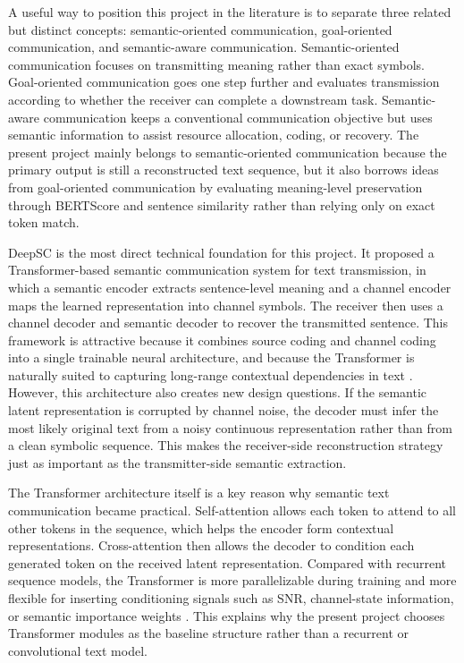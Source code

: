 A useful way to position this project in the literature is to separate three related but distinct concepts: semantic-oriented communication, goal-oriented communication, and semantic-aware communication. Semantic-oriented communication focuses on transmitting meaning rather than exact symbols. Goal-oriented communication goes one step further and evaluates transmission according to whether the receiver can complete a downstream task. Semantic-aware communication keeps a conventional communication objective but uses semantic information to assist resource allocation, coding, or recovery. The present project mainly belongs to semantic-oriented communication because the primary output is still a reconstructed text sequence, but it also borrows ideas from goal-oriented communication by evaluating meaning-level preservation through BERTScore and sentence similarity rather than relying only on exact token match.

DeepSC is the most direct technical foundation for this project. It proposed a Transformer-based semantic communication system for text transmission, in which a semantic encoder extracts sentence-level meaning and a channel encoder maps the learned representation into channel symbols. The receiver then uses a channel decoder and semantic decoder to recover the transmitted sentence. This framework is attractive because it combines source coding and channel coding into a single trainable neural architecture, and because the Transformer is naturally suited to capturing long-range contextual dependencies in text \cite{xie2021deepsc}. However, this architecture also creates new design questions. If the semantic latent representation is corrupted by channel noise, the decoder must infer the most likely original text from a noisy continuous representation rather than from a clean symbolic sequence. This makes the receiver-side reconstruction strategy just as important as the transmitter-side semantic extraction.

The Transformer architecture itself is a key reason why semantic text communication became practical. Self-attention allows each token to attend to all other tokens in the sequence, which helps the encoder form contextual representations. Cross-attention then allows the decoder to condition each generated token on the received latent representation. Compared with recurrent sequence models, the Transformer is more parallelizable during training and more flexible for inserting conditioning signals such as SNR, channel-state information, or semantic importance weights \cite{vaswani2017attention}. This explains why the present project chooses Transformer modules as the baseline structure rather than a recurrent or convolutional text model.

